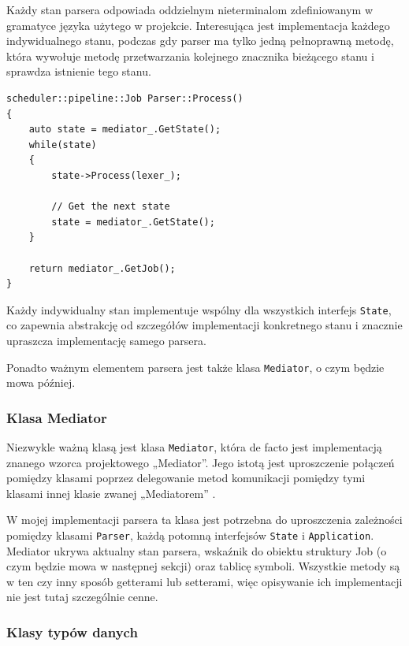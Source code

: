 Każdy stan parsera odpowiada oddzielnym nieterminalom zdefiniowanym w gramatyce języka użytego w projekcie. Interesująca jest implementacja każdego indywidualnego stanu, podczas gdy parser ma tylko jedną pełnoprawną metodę, która wywołuje metodę przetwarzania kolejnego znacznika bieżącego stanu i sprawdza istnienie tego stanu.


\begin{lstlisting}[label=list:parser,caption=Metoda Parser::Process(),basicstyle=\footnotesize\ttfamily]
scheduler::pipeline::Job Parser::Process()
{
    auto state = mediator_.GetState();
    while(state)
    {
        state->Process(lexer_);
    
        // Get the next state
        state = mediator_.GetState();
    }
    
    return mediator_.GetJob();
}
\end{lstlisting}

Każdy indywidualny stan implementuje wspólny dla wszystkich interfejs \texttt{State}, co zapewnia abstrakcję od szczegółów implementacji konkretnego stanu i znacznie upraszcza implementację samego parsera.

Ponadto ważnym elementem parsera jest także klasa \texttt{Mediator}, o czym będzie mowa później.

\subsubsection{Klasa Mediator}

Niezwykle ważną klasą jest klasa \texttt{Mediator}, która de facto jest implementacją znanego wzorca projektowego „Mediator”. Jego istotą jest uproszczenie połączeń pomiędzy klasami poprzez delegowanie metod komunikacji pomiędzy tymi klasami innej klasie zwanej „Mediatorem” \cite{mediator}.

W mojej implementacji parsera ta klasa jest potrzebna do uproszczenia zależności pomiędzy klasami \texttt{Parser}, każdą potomną interfejsów \texttt{State} i \texttt{Application}. Mediator ukrywa aktualny stan parsera, wskaźnik do obiektu struktury Job (o czym będzie mowa w następnej sekcji) oraz tablicę symboli. Wszystkie metody są w ten czy inny sposób getterami lub setterami, więc opisywanie ich implementacji nie jest tutaj szczególnie cenne.

\subsubsection{Klasy typów danych}

